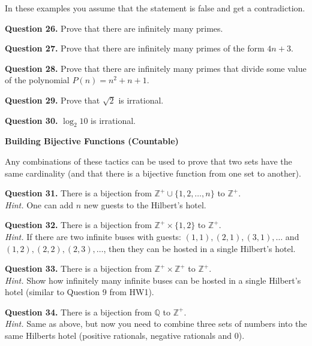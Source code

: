 \documentclass[jou]{apa6}
\begin{document}
In these examples you assume that the statement is false
and get a contradiction.


\vspace{6pt}
{\bf Question 26.} Prove that there are infinitely many primes.

\vspace{6pt}
{\bf Question 27.} Prove that there are infinitely many primes of the form $4n+3$. 

\vspace{6pt}
{\bf Question 28.} Prove that there are infinitely many primes
that divide some value of the polynomial 
$P(n) = n^2 + n + 1$. 

\vspace{6pt}
{\bf Question 29.}
Prove that $\sqrt{2}$ is irrational.

\vspace{6pt}
{\bf Question 30.}
$\log_2 10$ is irrational.


\vspace{20pt}
{\bf Building Bijective Functions (Countable)}

Any combinations of these tactics can be used
to prove that two sets have the same cardinality
(and that there is a bijective function from one set to another).

\vspace{6pt}
{\bf Question 31.}
There is a bijection from $\mathbb{Z}^{+} \cup \{ 1,2,\ldots,n \}$
to $\mathbb{Z}^{+}$.\\
{\em Hint.} One can add $n$ new guests to the Hilbert's hotel.

\vspace{6pt}
{\bf Question 32.}
There is a bijection from $\mathbb{Z}^{+} \times \{ 1,2 \}$
to $\mathbb{Z}^{+}$.\\
{\em Hint.} If there are two infinite buses with guests: 
$(1,1),(2,1),(3,1),\ldots$ and $(1,2),(2,2),(2,3),\ldots$, 
then they can be hosted in a single Hilbert's hotel.

\vspace{6pt}
{\bf Question 33.}
There is a bijection from $\mathbb{Z}^{+} \times \mathbb{Z}^{+}$
to $\mathbb{Z}^{+}$.\\
{\em Hint.} Show how infinitely many infinite buses can be hosted in a 
single Hilbert's hotel (similar to Question 9 from HW1).

\vspace{6pt}
{\bf Question 34.}
There is a bijection from $\mathbb{Q}$ to $\mathbb{Z}^{+}$.\\
{\em Hint.} Same as above, but now you need to combine
three sets of numbers into the same Hilberts hotel (positive rationals, 
negative rationals and $0$). 
\end{document}

